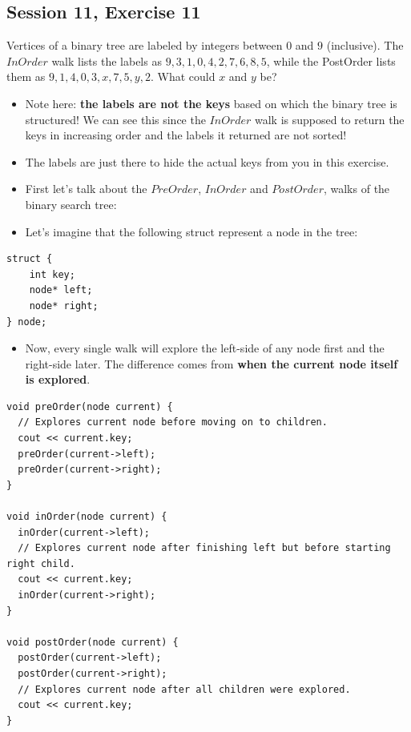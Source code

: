\subsection {Session 11, Exercise 11}


Vertices of a binary tree are labeled by integers between $0$ and $9$ (inclusive). The $InOrder$ walk lists the
labels as $9, 3, 1, 0, 4, 2, 7, 6, 8, 5$, while the PostOrder lists them as $9, 1, 4, 0, 3, x, 7, 5, y, 2$. What could
$x$ and $y$ be?



\begin{itemize}
    \item Note here: \textbf{the labels are not the keys} based on which the binary tree is structured! We can see this since the $InOrder$ walk is supposed to return the keys in increasing order and the labels it returned are not sorted!
    \item The labels are just there to hide the actual keys from you in this exercise.
    \item First let's talk about the $PreOrder$, $InOrder$ and $PostOrder$, walks of the binary search tree:
    \item Let's imagine that the following struct represent a node in the tree:
\end{itemize}

\begin{verbatim}
struct {
    int key;
    node* left;
    node* right;
} node;
\end{verbatim}

\begin{itemize}
    \item Now, every single walk will explore the left-side of any node first and the right-side later. The difference comes from \textbf{when the current node itself is explored}.
\end{itemize}

\begin{verbatim}
void preOrder(node current) {
  // Explores current node before moving on to children.
  cout << current.key;
  preOrder(current->left);
  preOrder(current->right);
}

void inOrder(node current) {
  inOrder(current->left);
  // Explores current node after finishing left but before starting right child.
  cout << current.key;
  inOrder(current->right);
}

void postOrder(node current) {
  postOrder(current->left);
  postOrder(current->right);
  // Explores current node after all children were explored.
  cout << current.key;
}
\end{verbatim}

